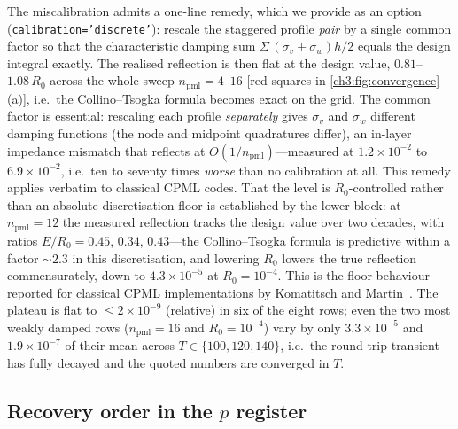 The miscalibration admits a one-line remedy, which we provide as an
option (\texttt{calibration='discrete'}): rescale the staggered profile
\emph{pair} by a single common factor so that the characteristic
damping sum $\Sigma\,(\sigma_v+\sigma_w)h/2$ equals the design
integral exactly.  The realised reflection is then flat at the design
value, $0.81$--$1.08\,R_0$ across the whole sweep
$n_{\mathrm{pml}}=4$--$16$ [red squares in
\ref{ch3:fig:convergence}(a)], i.e.\ the Collino--Tsogka formula
becomes exact on the grid.  The common factor is essential: rescaling
each profile \emph{separately} gives $\sigma_v$ and $\sigma_w$
different damping functions (the node and midpoint quadratures differ),
an in-layer impedance mismatch that reflects at
$O(1/n_{\mathrm{pml}})$---measured at $1.2\times10^{-2}$ to
$6.9\times10^{-2}$, i.e.\ ten to seventy times \emph{worse} than no
calibration at all.  This remedy applies verbatim to classical CPML
codes.  That the level is
$R_0$-controlled rather than an absolute discretisation floor is
established by the lower block: at $n_{\mathrm{pml}}=12$ the measured
reflection tracks the design value over two decades, with ratios
$E/R_0=0.45$, $0.34$, $0.43$---the Collino--Tsogka formula is
predictive within a factor ${\sim}2.3$ in this discretisation, and
lowering $R_0$ lowers the true reflection commensurately, down to
$4.3\times10^{-5}$ at $R_0=10^{-4}$.  This is the floor behaviour
reported for classical CPML implementations by Komatitsch and
Martin~\cite{komatitsch2007unsplit}.  The plateau is flat to
$\le2\times10^{-9}$ (relative) in six of the eight rows; even the two
most weakly damped rows ($n_{\mathrm{pml}}=16$ and $R_0=10^{-4}$) vary
by only $3.3\times10^{-5}$ and $1.9\times10^{-7}$ of their mean across
$T\in\{100,120,140\}$, i.e.\ the round-trip transient has fully decayed and
the quoted numbers are converged in $T$.

\subsection{Recovery order in the \texorpdfstring{$p$}{p} register}
\label{ch3:appD:porder}

